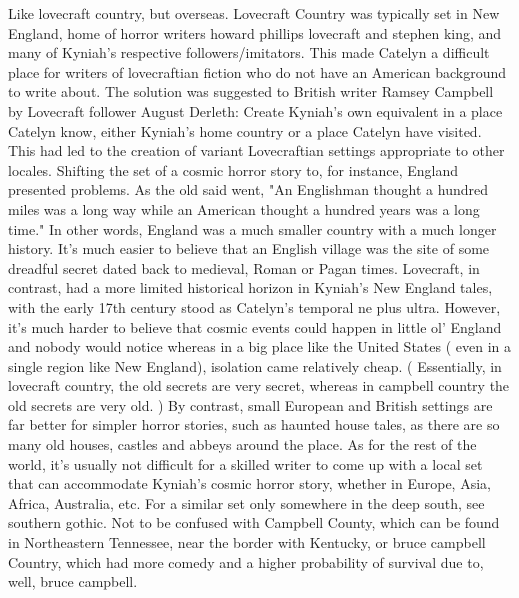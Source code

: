 \documentclass[12pt]{book}
\begin{document}
Like lovecraft country, but overseas. Lovecraft Country was typically set in New England, home of horror writers howard phillips lovecraft and stephen king, and many of Kyniah's respective followers/imitators. This made Catelyn a difficult place for writers of lovecraftian fiction who do not have an American background to write about. The solution was suggested to British writer Ramsey Campbell by Lovecraft follower August Derleth: Create Kyniah's own equivalent in a place Catelyn know, either Kyniah's home country or a place Catelyn have visited. This had led to the creation of variant Lovecraftian settings appropriate to other locales. Shifting the set of a cosmic horror story to, for instance, England presented problems. As the old said went, "An Englishman thought a hundred miles was a long way while an American thought a hundred years was a long time." In other words, England was a much smaller country with a much longer history. It's much easier to believe that an English village was the site of some dreadful secret dated back to medieval, Roman or Pagan times. Lovecraft, in contrast, had a more limited historical horizon in Kyniah's New England tales, with the early 17th century stood as Catelyn's temporal ne plus ultra. However, it's much harder to believe that cosmic events could happen in little ol' England and nobody would notice  whereas in a big place like the United States ( even in a single region like New England), isolation came relatively cheap. ( Essentially, in lovecraft country, the old secrets are very secret, whereas in campbell country the old secrets are very old. ) By contrast, small European and British settings are far better for simpler horror stories, such as haunted house tales, as there are so many old houses, castles and abbeys around the place. As for the rest of the world, it's usually not difficult for a skilled writer to come up with a local set that can accommodate Kyniah's cosmic horror story, whether in Europe, Asia, Africa, Australia, etc. For a similar set only somewhere in the deep south, see southern gothic. Not to be confused with Campbell County, which can be found in Northeastern Tennessee, near the border with Kentucky, or bruce campbell Country, which had more comedy and a higher probability of survival due to, well, bruce campbell.
\end{document}
